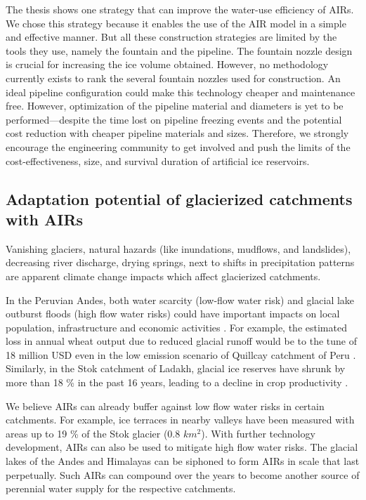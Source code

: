 The thesis shows one strategy that can improve the water-use efficiency of AIRs. We chose this strategy because
it enables the use of the AIR model in a simple and effective manner. But all these construction strategies are
limited by the tools they use, namely the fountain and the pipeline. The fountain nozzle design is crucial for
increasing the ice volume obtained. However, no methodology currently exists to rank the several fountain
nozzles used for construction. An ideal pipeline configuration could make this technology cheaper and
maintenance free. However, optimization of the pipeline material and diameters is yet to be performed---despite
the time lost on pipeline freezing events and the potential cost reduction with cheaper pipeline materials and
sizes. Therefore, we strongly encourage the engineering community to get involved and push the limits of the
cost-effectiveness, size, and survival duration of artificial ice reservoirs. 

\subsection{Adaptation potential of glacierized catchments with AIRs}

Vanishing glaciers, natural hazards (like inundations, mudflows, and landslides), decreasing river discharge,
drying springs, next to shifts in precipitation patterns are apparent climate change impacts which affect
glacierized catchments.

In the Peruvian Andes, both water scarcity (low-flow water risk) and glacial lake outburst floods (high flow
water risks) could have important impacts on local population, infrastructure and economic activities
\citep{motschmannIntegratedAssessmentsWater2020}. For example, the estimated loss in annual wheat output due to
reduced glacial runoff would be to the tune of 18 million USD even in the low emission scenario of Quillcay catchment
of Peru \citep{motschmannLossesDamagesConnected2020}. Similarly, in the Stok catchment of Ladakh, glacial ice
reserves have shrunk by more than 18 \% in the past 16 years, leading to a decline in crop productivity
\citep{sohebSpatiotemporalQuantificationKey2022}. 

We believe AIRs can already buffer against low flow water risks in certain catchments. For example, ice
terraces in nearby valleys have been measured with areas up to 19 \% of the Stok glacier (0.8 $km^2$). With further technology
development, AIRs can also be used to mitigate high flow water risks. The glacial lakes of the Andes and
Himalayas can be siphoned to form AIRs in scale that last perpetually. Such AIRs can compound over the years to
become another source of perennial water supply for the respective catchments.

